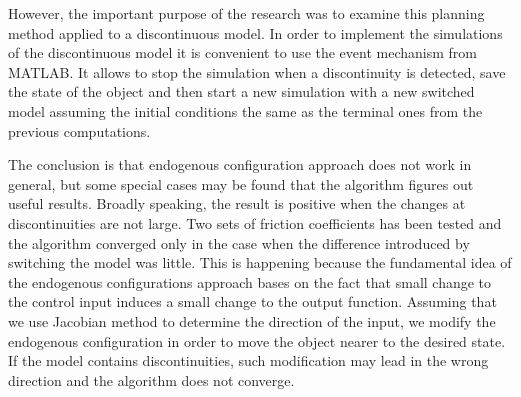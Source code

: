 However, the important purpose of the research was to examine
this planning method applied to a discontinuous model.
In order to implement the simulations of the discontinuous model it is convenient to use the event
mechanism from MATLAB. It allows to stop the simulation when a discontinuity is detected, save the state
of the object and then start a new simulation with a new switched model assuming the initial conditions
the same as the terminal ones from the previous computations.

The conclusion is that endogenous configuration approach does not work
in general, but some special cases may be found that the algorithm figures out useful results.
Broadly speaking, the result is positive when the changes at discontinuities are not
large. Two sets of friction coefficients has been tested and the algorithm
converged only in the case when the difference introduced by switching the model was little.
This is happening because the fundamental idea of the endogenous configurations approach
bases on the fact that small change to the control input induces a small change to the output function.
Assuming that we use Jacobian method to determine the direction of the input, we modify the endogenous
configuration in order to move the object nearer to the desired state. If the model contains
discontinuities, such modification may lead in the wrong direction and the algorithm does not converge.
